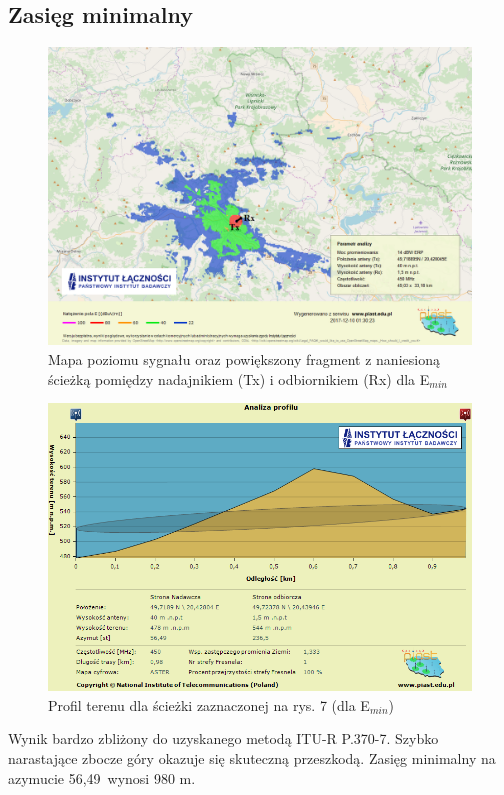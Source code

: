 \documentclass[12pt, a4paper, oneside]{article}
\begin{document}
\subsection{Zasięg minimalny}
\begin{figure}[h!]
\centering
\includegraphics[scale=0.45]{pics/piast/f2.png}
\caption{Mapa poziomu sygnału oraz powiększony fragment z naniesioną ścieżką pomiędzy nadajnikiem (Tx) i odbiornikiem (Rx) dla E$_{min}$}
\end{figure}
\begin{figure}[h!]
\centering
\includegraphics[scale=0.45]{pics/piast/f4.png}
\caption{Profil terenu dla ścieżki zaznaczonej na rys. 7 (dla E$_{min}$)}
\end{figure}
Wynik bardzo zbliżony do uzyskanego metodą ITU-R P.370-7. Szybko narastające zbocze góry okazuje się skuteczną przeszkodą. Zasięg minimalny na azymucie 56,49\textdegree ~wynosi 980 m.
\clearpage
\end{document}
